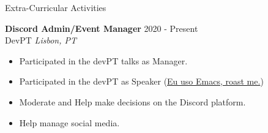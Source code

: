 \documentclass{resume} %
\begin{document}


\begin{rSection}{Extra-Curricular Activities}

  \textbf{Discord Admin/Event Manager} \hfill 2020 - Present \\
  DevPT \hfill \textit{Lisbon, PT}
  \begin{itemize}
    \itemsep -3pt {} 
  \item Participated in the devPT talks as Manager.
  \item Participated in the devPT as Speaker (\href{https://www.youtube.com/watch?v=p7FrTaukioI&t=2693s}{Eu uso Emacs, roast me.})
  \item Moderate and Help make decisions on the Discord platform.
  \item Help manage social media.
  \end{itemize}

\end{rSection}
\end{document}
